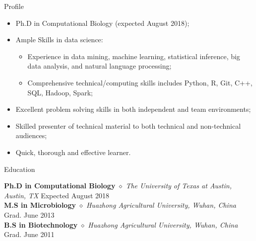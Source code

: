 \documentclass{my_resume} %
\begin{document}

\begin{rSection}{Profile}
\renewcommand\labelitemi{$\cdot$}
\begin{itemize}
  \item Ph.D in Computational Biology (expected August 2018);
  \vspace{-1.7em}\\
  \item Ample Skills in data science:
  \vspace{-1.7em}\\
    \begin{itemize}
      \item Experience in data mining, machine learning, statistical inference,
        big data analysis, and natural language processing;
      \vspace{-1.7em}\\
      \item Comprehensive technical/computing skills includes Python, R, Git,
        C++, SQL, Hadoop, Spark;
      \vspace{-1.7em}\\
    \end{itemize}
  \item Excellent problem solving skills in both independent and team
    environments;
  \vspace{-1.7em}\\
  \item Skilled presenter of technical material to both technical and
    non-technical audiences;
  \vspace{-1.7em}\\
  \item Quick, thorough and effective learner.
\end{itemize}
\end{rSection}


\begin{rSection}{Education}

{\bf Ph.D in Computational Biology} {$\diamond$} {\em The University of
Texas at Austin, Austin, TX} \hfill {Expected August 2018} \\
{\bf M.S in Microbiology} {$\diamond$} {\em Huazhong Agricultural University,
Wuhan, China} \hfill {Grad. June 2013} \\
{\bf B.S in Biotechnology} {$\diamond$} {\em Huazhong Agricultural University,
Wuhan, China} \hfill {Grad. June 2011}
\end{rSection}
\end{document}
